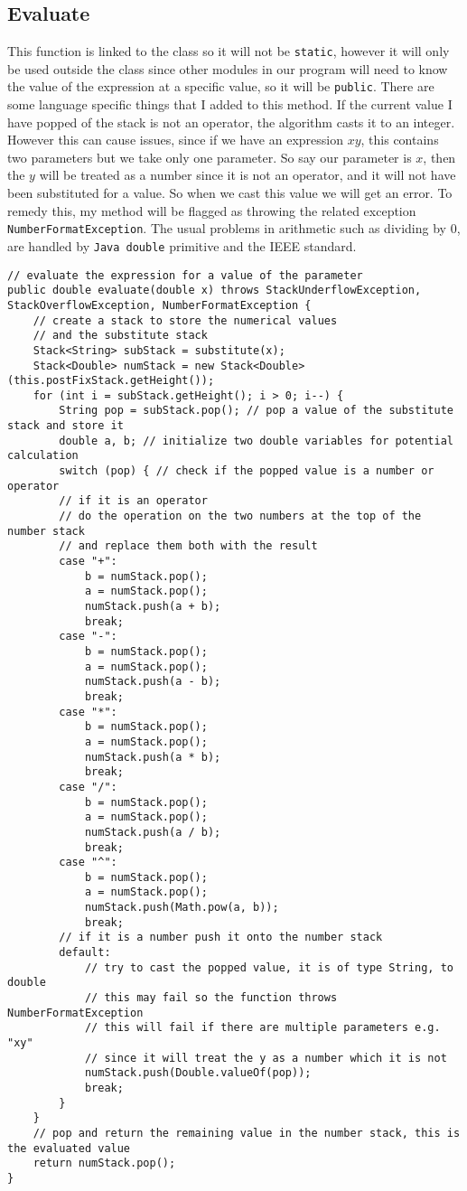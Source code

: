 \documentclass[../../../../main.tex]{subfiles}
\begin{document}
\subsection{Evaluate}
This function is linked to the class so it will not be \texttt{static}, however it will only be used outside the class since other modules in our program will need to know the value of the expression at a specific value, so it will be \texttt{public}. There are some language specific things that I added to this method. If the current value I have popped of the stack is not an operator, the algorithm casts it to an integer. However this can cause issues, since if we have an expression $xy$, this contains two parameters but we take only one parameter. So say our parameter is $x$, then the $y$ will be treated as a number since it is not an operator, and it will not have been substituted for a value. So when we cast this value we will get an error. To remedy this, my method will be flagged as throwing the related exception \texttt{NumberFormatException}. The usual problems in arithmetic such as dividing by 0, are handled by \texttt{Java double} primitive and the IEEE standard\cite{doubleJava, doubleIEEE}.
\begin{verbatim}
// evaluate the expression for a value of the parameter
public double evaluate(double x) throws StackUnderflowException, StackOverflowException, NumberFormatException {
	// create a stack to store the numerical values
	// and the substitute stack
	Stack<String> subStack = substitute(x);
	Stack<Double> numStack = new Stack<Double>(this.postFixStack.getHeight());
	for (int i = subStack.getHeight(); i > 0; i--) {
		String pop = subStack.pop(); // pop a value of the substitute stack and store it
		double a, b; // initialize two double variables for potential calculation
		switch (pop) { // check if the popped value is a number or operator
		// if it is an operator
		// do the operation on the two numbers at the top of the number stack
		// and replace them both with the result
		case "+":
			b = numStack.pop();
			a = numStack.pop();
			numStack.push(a + b);
			break;
		case "-":
			b = numStack.pop();
			a = numStack.pop();
			numStack.push(a - b);
			break;
		case "*":
			b = numStack.pop();
			a = numStack.pop();
			numStack.push(a * b);
			break;
		case "/":
			b = numStack.pop();
			a = numStack.pop();
			numStack.push(a / b);
			break;
		case "^":
			b = numStack.pop();
			a = numStack.pop();
			numStack.push(Math.pow(a, b));
			break;
		// if it is a number push it onto the number stack
		default:
			// try to cast the popped value, it is of type String, to double
			// this may fail so the function throws NumberFormatException
			// this will fail if there are multiple parameters e.g. "xy"
			// since it will treat the y as a number which it is not
			numStack.push(Double.valueOf(pop));
			break;
		}
	}
	// pop and return the remaining value in the number stack, this is the evaluated value
	return numStack.pop();
}
\end{verbatim}
\end{document}
